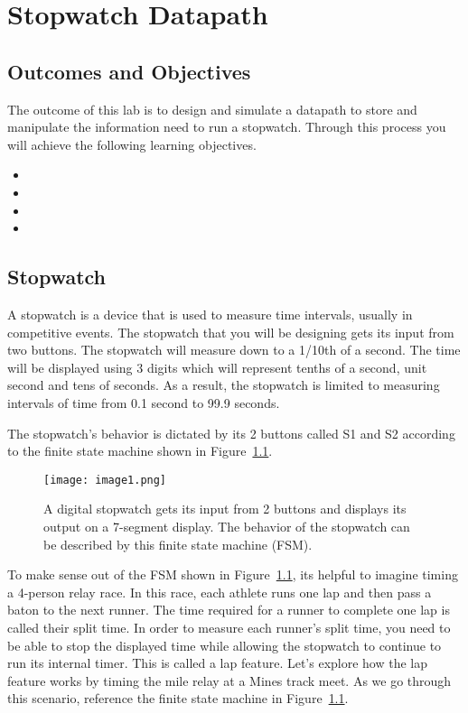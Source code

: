 \chapter{Stopwatch Datapath}
\label{chapter:stopDatapath}
\graphicspath{ {./Lab09Datapath/Fig} }

\section{Outcomes and Objectives}

The outcome of this lab is to design and simulate
a datapath to store and manipulate the information need to run a stopwatch.
Through this process you will achieve the following
learning objectives.
\begin{itemize}
    \item {}
    \item {}
    \item {}
    \item {}
\end{itemize}

\section{Stopwatch}

A stopwatch is a device that is used to measure time intervals, usually
in competitive events. The stopwatch that you will be designing gets its
input from two buttons. The stopwatch will measure down to a 1/10th of a
second. The time will be displayed using 3 digits which will represent
tenths of a second, unit second and tens of seconds. As a result, the
stopwatch is limited to measuring intervals of time from 0.1 second to
99.9 seconds.

The stopwatch's behavior is dictated by its 2 buttons called S1 and S2
according to the finite state machine shown in Figure~\ref{fig:swDPbehavior}.

\begin{figure}[ht]
    \texttt{[image: image1.png]}
    \caption{A digital stopwatch gets its input from 2 buttons and displays
        its output on a 7-segment display. The behavior of the stopwatch can be
    described by this finite state machine (FSM).}
    \label{fig:swDPbehavior}
\end{figure}

To make sense out of the FSM shown in Figure~\ref{fig:swDPbehavior}, its helpful to imagine
timing a 4-person relay race. In this race, each athlete runs one lap
and then pass a baton to the next runner. The time required for a runner
to complete one lap is called their split time. In order to measure each
runner's split time, you need to be able to stop the displayed time
while allowing the stopwatch to continue to run its internal timer. This
is called a lap feature. Let's explore how the lap feature works by
timing the mile relay at a Mines track meet. As we go through this
scenario, reference the finite state machine in Figure~\ref{fig:swDPbehavior}.

